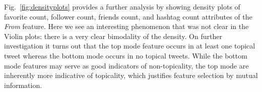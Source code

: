 Fig.~\ref{fig:densityplots} provides a further analysis by showing
density plots of favorite count, follower count, friends count, and
hashtag count attributes of the \textit{From} feature.  Here we see an
interesting phenomenon that was not clear in the Violin plots: there
is a very clear bimodality of the density.  On further investigation
it turns out that the top mode feature occurs in at least one topical
tweet whereas the bottom mode occurs in no topical tweets.  While the
bottom mode features may serve as good indicators of non-topicality,
the top mode are inherently more indicative of topicality, which
justifies feature selection by mutual information.
\ENDCOMMENT
